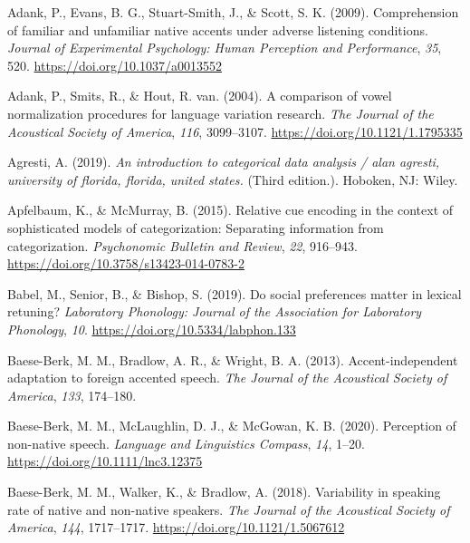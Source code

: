 \documentclass[
  11pt,
  english,
  man,floatsintext]{apa6}
\newlength{\cslhangindent}
\newlength{\cslentryspacingunit} %
\newenvironment{CSLReferences}[2] %
 {%
  \setlength{\parindent}{0pt}
  \ifodd #1
  \let\oldpar\par
  \def\par{\hangindent=\cslhangindent\oldpar}
  \fi
  \setlength{\parskip}{#2\cslentryspacingunit}
 }%
 {}
\begin{document}
\hypertarget{refs}{}
\begin{CSLReferences}{1}{0}
\leavevmode{}%
Adank, P., Evans, B. G., Stuart-Smith, J., \& Scott, S. K. (2009). Comprehension of familiar and unfamiliar native accents under adverse listening conditions. \emph{Journal of Experimental Psychology: Human Perception and Performance}, \emph{35}, 520. \url{https://doi.org/10.1037/a0013552}

\leavevmode{}%
Adank, P., Smits, R., \& Hout, R. van. (2004). A comparison of vowel normalization procedures for language variation research. \emph{The Journal of the Acoustical Society of America}, \emph{116}, 3099--3107. \url{https://doi.org/10.1121/1.1795335}

\leavevmode{}%
Agresti, A. (2019). \emph{An introduction to categorical data analysis / alan agresti, university of florida, florida, united states.} (Third edition.). Hoboken, NJ: Wiley.

\leavevmode{}%
Apfelbaum, K., \& McMurray, B. (2015). Relative cue encoding in the context of sophisticated models of categorization: Separating information from categorization. \emph{Psychonomic Bulletin and Review}, \emph{22}, 916--943. \url{https://doi.org/10.3758/s13423-014-0783-2}

\leavevmode{}%
Babel, M., Senior, B., \& Bishop, S. (2019). Do social preferences matter in lexical retuning? \emph{Laboratory Phonology: Journal of the Association for Laboratory Phonology}, \emph{10}. \url{https://doi.org/10.5334/labphon.133}

\leavevmode{}%
Baese-Berk, M. M., Bradlow, A. R., \& Wright, B. A. (2013). Accent-independent adaptation to foreign accented speech. \emph{The Journal of the Acoustical Society of America}, \emph{133}, 174--180.

\leavevmode{}%
Baese-Berk, M. M., McLaughlin, D. J., \& McGowan, K. B. (2020). Perception of non-native speech. \emph{Language and Linguistics Compass}, \emph{14}, 1--20. \url{https://doi.org/10.1111/lnc3.12375}

\leavevmode{}%
Baese-Berk, M. M., Walker, K., \& Bradlow, A. (2018). Variability in speaking rate of native and non-native speakers. \emph{The Journal of the Acoustical Society of America}, \emph{144}, 1717--1717. \url{https://doi.org/10.1121/1.5067612}


\end{CSLReferences}
\end{document}
